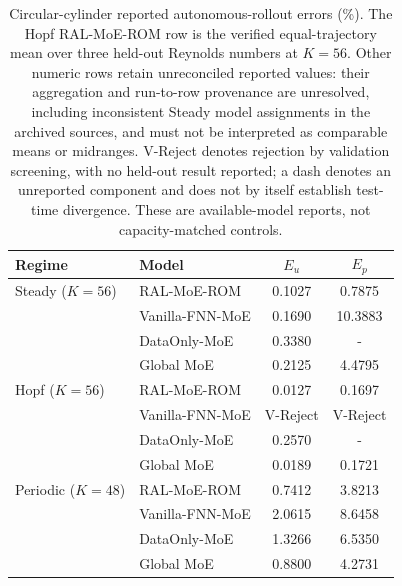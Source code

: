 \begin{table}[H]
\centering
\caption{Circular-cylinder reported autonomous-rollout errors (\%). The Hopf RAL-MoE-ROM row is the verified equal-trajectory mean over three held-out Reynolds numbers at $K=56$. Other numeric rows retain unreconciled reported values: their aggregation and run-to-row provenance are unresolved, including inconsistent Steady model assignments in the archived sources, and must not be interpreted as comparable means or midranges. V-Reject denotes rejection by validation screening, with no held-out result reported; a dash denotes an unreported component and does not by itself establish test-time divergence. These are available-model reports, not capacity-matched controls.}
\label{tab:circular_full_reorg}
\small
\setlength{\tabcolsep}{4pt}
\begin{tabular}{llcc}
\toprule
Regime & Model & $E_u$ & $E_p$ \\
\midrule
Steady ($K=56$)
& RAL-MoE-ROM & 0.1027 & 0.7875 \\
& Vanilla-FNN-MoE & 0.1690 & 10.3883 \\
& DataOnly-MoE & 0.3380 & - \\
& Global MoE & 0.2125 & 4.4795 \\
\midrule
Hopf ($K=56$)
& RAL-MoE-ROM & 0.0127 & 0.1697 \\
& Vanilla-FNN-MoE & V-Reject & V-Reject \\
& DataOnly-MoE & 0.2570 & - \\
& Global MoE & 0.0189 & 0.1721 \\
\midrule
Periodic ($K=48$)
& RAL-MoE-ROM & 0.7412 & 3.8213 \\
& Vanilla-FNN-MoE & 2.0615 & 8.6458 \\
& DataOnly-MoE & 1.3266 & 6.5350 \\
& Global MoE & 0.8800 & 4.2731 \\
\bottomrule
\end{tabular}
\end{table}
















